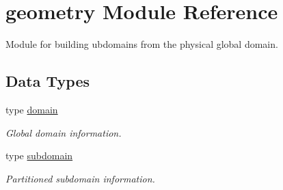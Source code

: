\hypertarget{namespacegeometry}{}\section{geometry Module Reference}
\label{namespacegeometry}


Module for building ubdomains from the physical global domain.  


\subsection*{Data Types}
\begin{DoxyCompactItemize}
\item 
type \hyperlink{structgeometry_1_1domain}{domain}
\begin{DoxyCompactList}\small\item\em Global domain information. \end{DoxyCompactList}\item 
type \hyperlink{structgeometry_1_1subdomain}{subdomain}
\begin{DoxyCompactList}\small\item\em Partitioned subdomain information. \end{DoxyCompactList}\end{DoxyCompactItemize}
